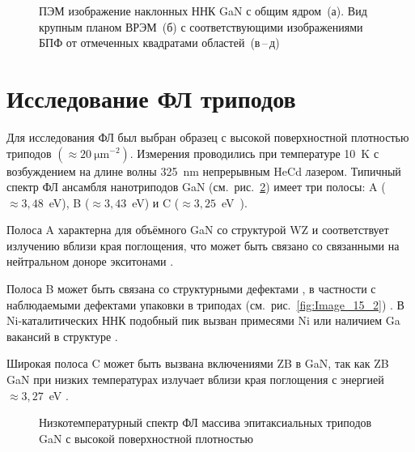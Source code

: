 \begin{figure}[ht]  \caption{ПЭМ
				изображение наклонных ННК GaN с общим ядром~(а). Вид крупным планом
				ВРЭМ~(б) с соответствующими изображениями БПФ от отмеченных квадратами
		областей~(в\,--\,д)}\label{fig:Image_18} \end{figure}

\section{Исследование ФЛ триподов}\label{sec:ch3/sec5}

Для исследования ФЛ был выбран образец с высокой поверхностной плотностью
триподов \((\approx 20~\si{\micro\meter^{-2}})\). Измерения проводились при
температуре 10~\si{\kelvin} с возбуждением на длине волны 325~\si{\nano\meter}
непрерывным HeCd лазером. Типичный спектр ФЛ ансамбля нанотриподов GaN
(см.~рис.~\cref{fig:Image_19}) имеет три полосы: A (\(\approx
3,48\)~\si{\electronvolt}), B (\(\approx 3,43\)~\si{\electronvolt}) и C
(\(\approx 3,25\)~\si{\electronvolt)}.

Полоса A характерна для объёмного GaN со структурой WZ и соответствует
излучению вблизи края поглощения, что может быть связано со связанными на
нейтральном доноре экситонами \cite{Bolshakov2018, Richter2008, Agekyan2013}.

Полоса B может быть связана со структурными дефектами \cite{Calleja2000}, в
частности с наблюдаемыми дефектами упаковки в триподах
(см.~рис.~\cref{fig:Image_15_2}) \cite{Albrecht1997, Paskov2005}. В
Ni-каталитических ННК подобный пик вызван примесями Ni или наличием Ga вакансий
в структуре \cite{Yoo2006}.

Широкая полоса C может быть вызвана включениями ZB в GaN, так как ZB GaN при
низких температурах излучает вблизи края поглощения с энергией \(\approx
3,27\)~\si{\electronvolt} \cite{Jacobs2007}.

\begin{figure}[ht]   \caption{Низкотемпературный спектр ФЛ
		массива эпитаксиальных триподов GaN с высокой поверхностной
плотностью}\label{fig:Image_19} \end{figure}

